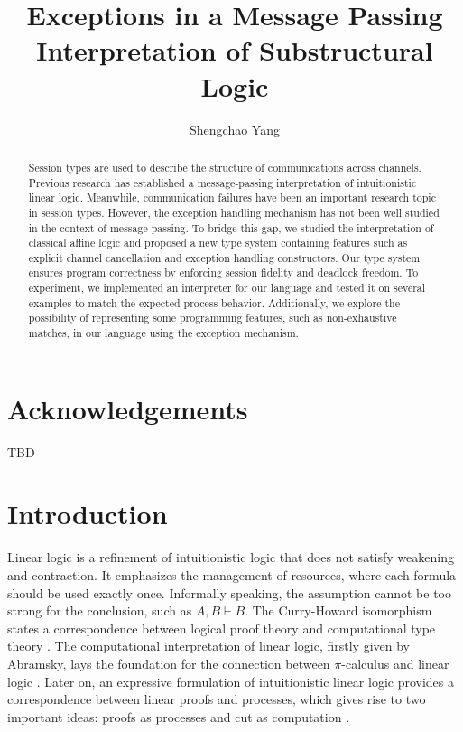 \documentclass[12pt, openany]{memoir}
\begin{document}
\frontmatter

\pagestyle{empty}

\title{\textbf{Exceptions in a Message Passing Interpretation of Substructural Logic}}
\author{Shengchao Yang}


\maketitle

\pagestyle{nonumbers}

\begin{abstract}
  Session types are used to describe the structure of communications across channels. Previous research has established a message-passing interpretation of intuitionistic linear logic. 
  Meanwhile, communication failures have been an important research topic in session types. 
  However, the exception handling mechanism has not been well studied in the context of message passing. 
  To bridge this gap, we studied the interpretation of classical affine logic and proposed a new type system containing features such as explicit channel cancellation and exception handling constructors. 
  Our type system ensures program correctness by enforcing session fidelity and deadlock freedom. 
  To experiment, we implemented an interpreter for our language and tested it on several examples to match the expected process behavior. 
  Additionally, we explore the possibility of representing some programming features, such as non-exhaustive matches, in our language using the exception mechanism.
\end{abstract}

\chapter{Acknowledgements}

TBD

\cleardoublepage
\tableofcontents

\mainmatter

\chapter{Introduction}

Linear logic is a refinement of intuitionistic logic that does not satisfy weakening and contraction. 
It emphasizes the management of resources, where each formula should be used exactly once. 
Informally speaking, the assumption cannot be too strong for the conclusion, such as $A, B \vdash B$.
The Curry-Howard isomorphism states a correspondence between logical proof theory and computational type theory \cite{Howard1980}.
The computational interpretation of linear logic, firstly given by Abramsky, lays the foundation for the connection between $\pi$-calculus and linear logic \cite{Abramsky1933}. 
Later on, an expressive formulation of intuitionistic linear logic provides a correspondence between linear proofs and processes, 
which gives rise to two important ideas: proofs as processes and cut as computation \cite{Caires2014}.
\end{document}
